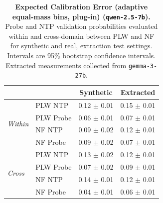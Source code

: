 \begin{table}[ht]
\centering
\begin{tabular}{ll cc}
\toprule
& & Synthetic & Extracted \\
\midrule
\multirow{4}{*}{\textit{Within}}
& PLW NTP & 0.12 $\pm$ 0.01 & 0.15 $\pm$ 0.01 \\
& PLW Probe & 0.06 $\pm$ 0.01 & 0.07 $\pm$ 0.01 \\
& NF NTP & 0.09 $\pm$ 0.02 & 0.12 $\pm$ 0.01 \\
& NF Probe & 0.09 $\pm$ 0.02 & 0.07 $\pm$ 0.01 \\
\midrule
\multirow{4}{*}{\textit{Cross}}
& PLW NTP & 0.13 $\pm$ 0.02 & 0.12 $\pm$ 0.01 \\
& PLW Probe & 0.07 $\pm$ 0.02 & 0.09 $\pm$ 0.01 \\
& NF NTP & 0.14 $\pm$ 0.01 & 0.12 $\pm$ 0.01 \\
& NF Probe & 0.04 $\pm$ 0.01 & 0.06 $\pm$ 0.01 \\
\bottomrule
\end{tabular}
\caption{\textbf{Expected Calibration Error (adaptive equal-mass bins, plug-in) (\texttt{qwen-2.5-7b}).} Probe and NTP validation probabilities evaluated within and cross-domain between PLW and NF for synthetic and real, extraction test settings. Intervals are 95\% bootstrap confidence intervals. Extracted measurements collected from \texttt{gemma-3-27b}.}
\label{tab:qwen-2.5-7b-gemma-3-27b-pond_nfix-ece_em}
\end{table}
